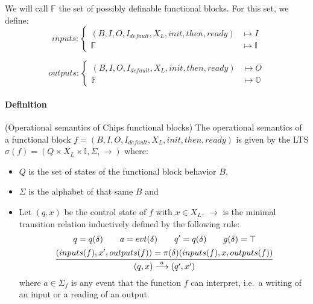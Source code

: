 \documentclass{article}
\newcommand{\aoverb}[2]{\stackrel{\mathclap{\footnotesize #1}}{#2}}
\newcommand{\s}{\hspace{1em}}
\begin{document}
We will call $\mathbb{F}$ the set of possibly definable functional blocks. For this set, we define:
\begin{equation*}
inputs :
\begin{cases}
(B, I, O, I_{default},X_L, init, then, ready)&\longmapsto I \\
\mathbb{F} &\longmapsto \mathbb{I}
\end{cases}
\end{equation*}

\begin{equation*}
outputs :
\begin{cases}
(B, I, O, I_{default},X_L, init, then, ready)&\longmapsto O \\
\mathbb{F} &\longmapsto \mathbb{O}
\end{cases}
\end{equation*}

\paragraph{Definition} (Operational semantics of Chips functional blocks) The operational semantics of a functional block $f = (B, I, O, I_{default},X_L, init, then, ready)$ is given by the LTS $\sigma(f) = (Q \times X_L \times \mathbb{I}, \Sigma, \rightarrow)$ where:
\begin{itemize}
    \item $Q$ is the set of states of the functional block behavior $B$,
    \item $\Sigma$ is the alphabet of that same $B$ and
    \item Let $(q,x)$ be the control state of $f$ with $x\in X_L$, $\rightarrow$ is the minimal transition relation inductively defined by the following rule:
    \begin{equation}
        \begin{split}
            q = q(\delta) \s\s a = evt(\delta)\s\s q' = q(\delta) \s\s g(\delta) = \top \s\s\\
            \cfrac{
                (inputs(f),x',outputs(f)) =  \pi(\delta)(inputs(f),x,outputs(f))
            }
            {
                (q,x) \aoverb{a}{\longrightarrow} (q',x')
            }
        \end{split}
    \end{equation}
    where $a \in \Sigma_f$ is any event that the function $f$ can interpret, i.e.~a writing of an input or a reading of an output.
\end{itemize}
\end{document}
